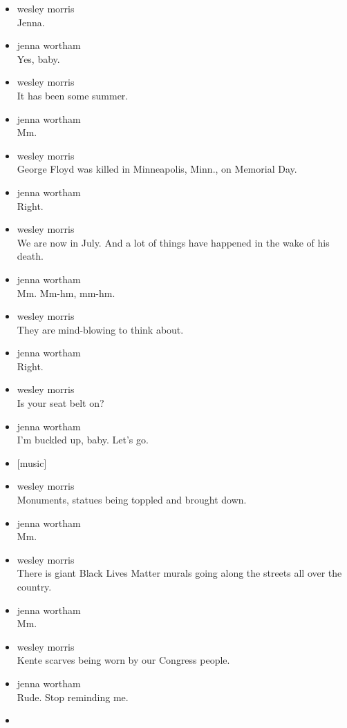 \begin{itemize}
\item
  wesley morris\\
  Jenna.
\item
  jenna wortham\\
  Yes, baby.
\item
  wesley morris\\
  It has been some summer.
\item
  jenna wortham\\
  Mm.
\item
  wesley morris\\
  George Floyd was killed in Minneapolis, Minn., on Memorial Day.
\item
  jenna wortham\\
  Right.
\item
  wesley morris\\
  We are now in July. And a lot of things have happened in the wake of
  his death.
\item
  jenna wortham\\
  Mm. Mm-hm, mm-hm.
\item
  wesley morris\\
  They are mind-blowing to think about.
\item
  jenna wortham\\
  Right.
\item
  wesley morris\\
  Is your seat belt on?
\item
  jenna wortham\\
  I'm buckled up, baby. Let's go.
\item
  {[}music{]}
\item
  wesley morris\\
  Monuments, statues being toppled and brought down.
\item
  jenna wortham\\
  Mm.
\item
  wesley morris\\
  There is giant Black Lives Matter murals going along the streets all
  over the country.
\item
  jenna wortham\\
  Mm.
\item
  wesley morris\\
  Kente scarves being worn by our Congress people.
\item
  jenna wortham\\
  Rude. Stop reminding me.
\item

\end{itemize}
